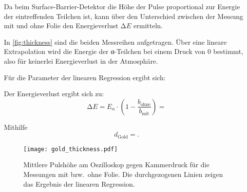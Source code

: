 Da beim Surface-Barrier-Detektor die Höhe der Pulse proportional zur Energie der eintreffenden Teilchen ist,
kann über den Unterschied zwischen der Messung mit und ohne Folie den Energieverlust $\increment E$ ermitteln.

In \autoref{fig:thickness} sind die beiden Messreihen aufgetragen.
Über eine lineare Extrapolation wird die Energie der α-Teilchen bei einem Druck von $0$ bestimmt, also für keinerlei Energieverlust in der Atmosphäre.

Für die Parameter der linearen Regression ergibt sich:

Der Energieverlust ergibt sich zu:
\begin{equation}
  \increment E = E_α \cdot \left(1 - \frac{b_\text{ohne}}{b_\text{mit}}\right)
  = 
\end{equation}

Mithilfe 
\begin{equation}
  d_\text{Gold} =  .
\end{equation}

\begin{figure}
  \centering
  \texttt{[image: gold\_thickness.pdf]}
  \caption{%
    Mittlere Pulshöhe am Oszilloskop gegen Kammerdruck für die Messungen mit bzw.\ ohne Folie.
    Die durchgezogenen Linien zeigen das Ergebnis der linearen Regression.%
  }\label{fig:thickness}
\end{figure}
